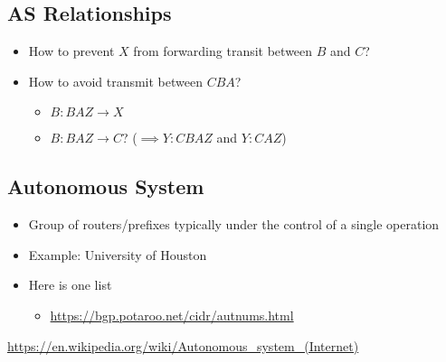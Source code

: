 \subsection{AS Relationships}
\begin{figure}[H]
\end{figure}
\begin{itemize}[nosep]
    \item How to prevent $X$ from forwarding transit between $B$ and $C$?
    \item How to avoid transmit between $CBA$?
          \begin{itemize}[nosep]
              \item $B: BAZ \to X$
              \item $B: BAZ \to C$? ($\implies Y:CBAZ$ and $Y:CAZ$)
          \end{itemize}
\end{itemize}
\subsection{Autonomous System}
\begin{itemize}[nosep]
    \item Group of routers/prefixes typically under the control of a single operation
    \item Example: University of Houston
    \item Here is one list
          \begin{itemize}[nosep]
              \item \url{https://bgp.potaroo.net/cidr/autnums.html}
          \end{itemize}
\end{itemize}
\url{https://en.wikipedia.org/wiki/Autonomous_system_(Internet)}
